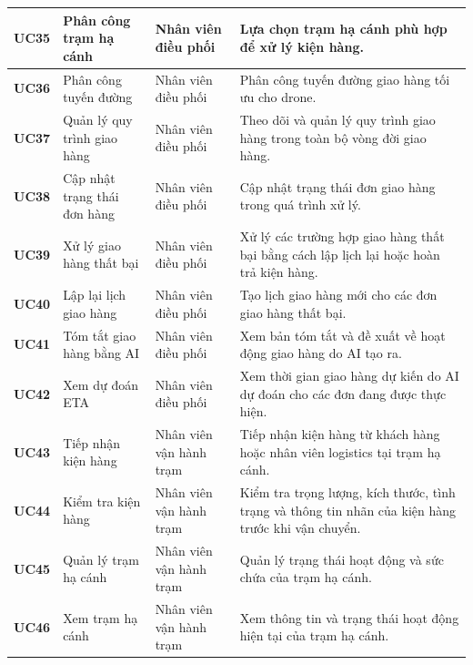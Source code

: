 \begin{longtable}{|p{1.2cm}|p{3.5cm}|p{2.8cm}|p{6.5cm}|}
\textbf{UC35} & Phân công trạm hạ cánh & Nhân viên điều phối &
Lựa chọn trạm hạ cánh phù hợp để xử lý kiện hàng. \\
\hline

\textbf{UC36} & Phân công tuyến đường & Nhân viên điều phối &
Phân công tuyến đường giao hàng tối ưu cho drone. \\
\hline

\textbf{UC37} & Quản lý quy trình giao hàng & Nhân viên điều phối &
Theo dõi và quản lý quy trình giao hàng trong toàn bộ vòng đời giao hàng. \\
\hline

\textbf{UC38} & Cập nhật trạng thái đơn hàng & Nhân viên điều phối &
Cập nhật trạng thái đơn giao hàng trong quá trình xử lý. \\
\hline

\textbf{UC39} & Xử lý giao hàng thất bại & Nhân viên điều phối &
Xử lý các trường hợp giao hàng thất bại bằng cách lập lịch lại hoặc hoàn trả kiện hàng. \\
\hline

\textbf{UC40} & Lập lại lịch giao hàng & Nhân viên điều phối &
Tạo lịch giao hàng mới cho các đơn giao hàng thất bại. \\
\hline

\textbf{UC41} & Tóm tắt giao hàng bằng AI & Nhân viên điều phối &
Xem bản tóm tắt và đề xuất về hoạt động giao hàng do AI tạo ra. \\
\hline

\textbf{UC42} & Xem dự đoán ETA & Nhân viên điều phối &
Xem thời gian giao hàng dự kiến do AI dự đoán cho các đơn đang được thực hiện. \\
\hline

\textbf{UC43} & Tiếp nhận kiện hàng & Nhân viên vận hành trạm &
Tiếp nhận kiện hàng từ khách hàng hoặc nhân viên logistics tại trạm hạ cánh. \\
\hline

\textbf{UC44} & Kiểm tra kiện hàng & Nhân viên vận hành trạm &
Kiểm tra trọng lượng, kích thước, tình trạng và thông tin nhãn của kiện hàng trước khi vận chuyển. \\
\hline

\textbf{UC45} & Quản lý trạm hạ cánh & Nhân viên vận hành trạm &
Quản lý trạng thái hoạt động và sức chứa của trạm hạ cánh. \\
\hline

\textbf{UC46} & Xem trạm hạ cánh & Nhân viên vận hành trạm &
Xem thông tin và trạng thái hoạt động hiện tại của trạm hạ cánh. \\
\hline


\end{longtable}
